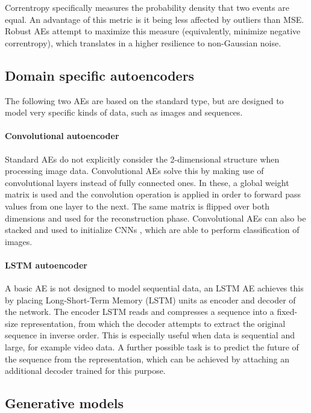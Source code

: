 Correntropy specifically measures the probability density that two events are equal. An advantage of this metric is it being less affected by outliers than MSE. Robust AEs attempt to maximize this measure (equivalently, minimize negative correntropy), which translates in a higher resilience to non-Gaussian noise.

\subsection{Domain specific autoencoders}\label{Sec.DomainSpecific}

The following two AEs are based on the standard type, but are designed to model very specific kinds of data, such as images and sequences.

\paragraph{Convolutional autoencoder \cite{ConvolutionalAE}} Standard AEs do not explicitly consider the 2-dimensional structure when processing image data. Convolutional AEs solve this by making use of convolutional layers instead of fully connected ones. In these, a global weight matrix is used and the convolution operation is applied in order to forward pass values from one layer to the next. The same matrix is flipped over both dimensions and used for the reconstruction phase. Convolutional AEs can also be stacked and used to initialize CNNs \cite{CNNsLeCun}, which are able to perform classification of images.


\paragraph{LSTM autoencoder \cite{LSTMAE}} A basic AE is not designed to model sequential data, an LSTM AE achieves this by placing Long-Short-Term Memory (LSTM) \cite{LSTM} units as encoder and decoder of the network. The encoder LSTM reads and compresses a sequence into a fixed-size representation, from which the decoder attempts to extract the original sequence in inverse order. This is especially useful when data is sequential and large, for example video data. A further possible task is to predict the future of the sequence from the representation, which can be achieved by attaching an additional decoder trained for this purpose.


\subsection{Generative models}\label{Sec.Generative}

